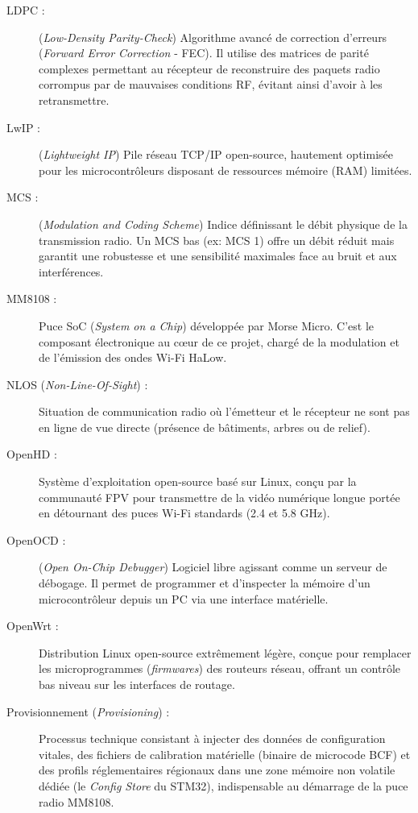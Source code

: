 \begin{description}
    \item[LDPC :] (\textit{Low-Density Parity-Check}) Algorithme avancé de correction d'erreurs 
    (\textit{Forward Error Correction} - FEC). Il utilise des matrices de parité complexes permettant au 
    récepteur de reconstruire des paquets radio corrompus par de mauvaises conditions RF, évitant ainsi 
    d'avoir à les retransmettre.
    
    \item[LwIP :] (\textit{Lightweight IP}) Pile réseau TCP/IP open-source, hautement optimisée pour les 
    microcontrôleurs disposant de ressources mémoire (RAM) limitées.
    
    \item[MCS :] (\textit{Modulation and Coding Scheme}) Indice définissant le débit physique de la transmission 
    radio. Un MCS bas (ex: MCS 1) offre un débit réduit mais garantit une robustesse et une sensibilité maximales 
    face au bruit et aux interférences.
    
    \item[MM8108 :] Puce SoC (\textit{System on a Chip}) développée par Morse Micro. C'est le composant 
    électronique au cœur de ce projet, chargé de la modulation et de l'émission des ondes Wi-Fi HaLow.
    
    \item[NLOS (\textit{Non-Line-Of-Sight}) :] Situation de communication radio où l'émetteur et le récepteur 
    ne sont pas en ligne de vue directe (présence de bâtiments, arbres ou de relief).
    
    \item[OpenHD :] Système d'exploitation open-source basé sur Linux, conçu par la communauté FPV pour 
    transmettre de la vidéo numérique longue portée en détournant des puces Wi-Fi standards (2.4 et 5.8 GHz).
    
    \item[OpenOCD :] (\textit{Open On-Chip Debugger}) Logiciel libre agissant comme un serveur de débogage. 
    Il permet de programmer et d'inspecter la mémoire d'un microcontrôleur depuis un PC via une interface matérielle.
    
    \item[OpenWrt :] Distribution Linux open-source extrêmement légère, conçue pour remplacer les microprogrammes 
    (\textit{firmwares}) des routeurs réseau, offrant un contrôle bas niveau sur les interfaces de routage.
    
    \item[Provisionnement (\textit{Provisioning}) :] Processus technique consistant à injecter des données de 
    configuration vitales, des fichiers de calibration matérielle (binaire de microcode BCF) et des profils 
    réglementaires régionaux dans une zone mémoire non volatile dédiée (le \textit{Config Store} du STM32), 
    indispensable au démarrage de la puce radio MM8108.
    

\end{description}

